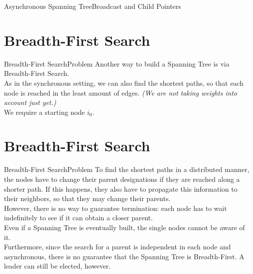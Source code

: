 \documentclass[pdf]{beamer}
\begin{document}
\begin{frame}{Asynchronous Spanning Tree}{Broadcast and Child Pointers}
	
	
\end{frame}

\section{Breadth-First Search}
\begin{frame}{Breadth-First Search}{Problem}
	Another way to build a Spanning Tree is via Breadth-First Search. \\
    \vspace{12pt}
    \pause
    As in the synchronous setting, we can also find the shortest paths, so that each node is reached in the least amount of edges. \emph{(We are not taking weights into account just yet.)} \\
    \vspace{12pt}
    \pause
    We require a starting node $i_0$.
\end{frame}

\section{Breadth-First Search}
\begin{frame}{Breadth-First Search}{Problem}
    To find the shortest paths in a distributed manner, the nodes have to change their parent designations if they are reached along a shorter path. If this happens, they also have to propagate this information to their neighbors, so that they may change their parents. \\
    \vspace{12pt}
    \pause
    However, there is no way to guarantee termination: each node has to wait indefinitely to see if it can obtain a closer parent. \\
    \vspace{12pt}
    \pause
    Even if a Spanning Tree is eventually built, the single nodes cannot be aware of it. \\
    \vspace{12pt}
    \pause
    Furthermore, since the search for a parent is independent in each node and asynchronous, there is no guarantee that the Spanning Tree is Breadth-First. A leader can still be elected, however.
\end{frame}
\end{document}

